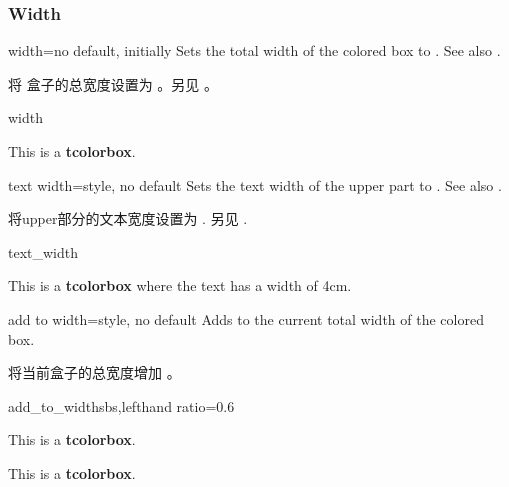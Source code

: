 \subsubsection{Width}

\begin{docTcbKey}{width}{=}{no default, initially }
Sets the total width of the colored box to .
See also .

将%
盒子的总宽度设置为 。另见 。
\begin{exdispExample}{width} 

\begin{tcolorbox}[width=\linewidth/2]
This is a \textbf{tcolorbox}.
\end{tcolorbox}
\end{exdispExample}
\end{docTcbKey}


\begin{docTcbKey}[][doc new=2014-10-31]{text width}{=}{style, no default}
Sets the text width of the upper part to .
See also .

将upper部分的文本宽度设置为 .
另见 .
\begin{exdispExample}{text_width}

\begin{tcolorbox}[text width=4cm]
This is a \textbf{tcolorbox} where the text has a width of 4cm.
\end{tcolorbox}
\end{exdispExample}
\end{docTcbKey}

\begin{docTcbKey}[][doc new=2014-11-07]{add to width}{=}{style, no default}
Adds  to the current total width of the colored box.

将当前盒子的总宽度增加  。    
\begin{exdispExample*}{add_to_width}{sbs,lefthand ratio=0.6}

\begin{tcolorbox}
This is a \textbf{tcolorbox}.
\end{tcolorbox}

\begin{tcolorbox}[add to width=1cm]
This is a \textbf{tcolorbox}.
\end{tcolorbox}
\end{exdispExample*}
\end{docTcbKey}

